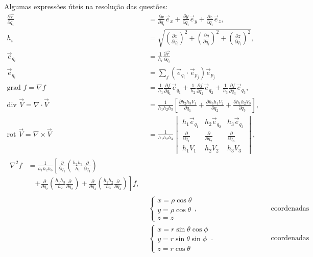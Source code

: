 \documentclass[a4paper,12pt, leqno, answers]{exam}
\newcommand{\devp}[2]{\frac{\partial #1}{\partial #2}}
\newcommand{\grad}{\mbox{grad }}
\newcommand{\diver}{\mbox{div }}
\newcommand{\rot}{\mbox{rot }}
\begin{document}
\thispagestyle{headandfoot}
Algumas express\~{o}es \'{u}teis na resolu\c{c}\~{a}o das quest\~{o}es:
\begin{align}
    \devp{\vec{r}}{q_i} &= \devp{x}{q_i} \vec{e}_x + \devp{y}{q_i} \vec{e}_y + \devp{z}{q_i} \vec{e}_z,
    \label{eq:vetor_tangente} \\
    h_i &= \sqrt{\left(\devp{x}{q_i}\right)^2 + \left(\devp{y}{q_i}\right)^2 + \left(\devp{z}{q_i}\right)^2},
    \label{eq:fator_escala} \\
    \vec{e}_{q_i} &= \frac{1}{h_i} \devp{\vec{r}}{q_i}
    \label{eq:vetor_tang_unit} \\
    \vec{e}_{q_i} &= \sum_j \left( \vec{e}_{q_i} \cdot \vec{e}_{p_j} \right) \vec{e}_{p_j}
    \label{eq:vetor_mud_coor} \\
    \grad f = \nabla f &= \frac{1}{h_1} \devp{f}{q_1} \vec{e}_{q_1} + \frac{1}{h_2} \devp{f}{q_2} \vec{e}_{q_2} + \frac{1}{h_3} \devp{f}{q_3} \vec{e}_{q_3},
    \label{eq:grad} \\
    \diver \vec{V} = \nabla \cdot \vec{V} &= \frac{1}{h_1 h_2 h_3} \left[\devp{h_2 h_3 V_1}{q_1} + \devp{h_3 h_1 V_2}{q_2} + \devp{h_1 h_2 V_3}{q_3}\right],
    \label{eq:div} \\
    \rot \vec{V} = \nabla \times \vec{V} &= \frac{1}{h_1 h_2 h_3} \begin{vmatrix}
        h_1 \vec{e}_{q_1} & h_2 \vec{e}_{q_2} & h_3 \vec{e}_{q_3} \\
        \devp{}{q_1}      & \devp{}{q_2}      & \devp{}{q_3}      \\
        h_1 V_1           & h_2 V_2           & h_3 V_3           
    \end{vmatrix},
    \label{eq:rot} \\
    \begin{split}
        \nabla^2 f &= \frac{1}{h_1 h_2 h_3} \left[\devp{}{q_1}\left(\frac{h_2 h_3}{h_1} \devp{}{q_1}\right)\right. \\ &\quad\left. + \devp{}{q_2}\left(\frac{h_1 h_3}{h_2} \devp{}{q_2}\right) + \devp{}{q_3}\left(\frac{h_1 h_2}{h_3} \devp{}{q_3}\right)\right] f,
    \end{split}
    \label{eq:laplaciano} \\
    & \begin{cases}
        x = \rho \cos \theta \\
        y = \rho \cos \theta \\
        z = z
    \end{cases}, && \text{coordenadas cil\'{i}ndricas}
    \label{eq:coor_cil} \\
    & \begin{cases}
        x = r \sin \theta \cos \phi \\
        y = r \sin \theta \sin \phi \\
        z = r \cos \theta
    \end{cases}. && \text{coordenadas esf\'{e}ricas}
    \label{eq:coor_esf}
\end{align}
\end{document}
